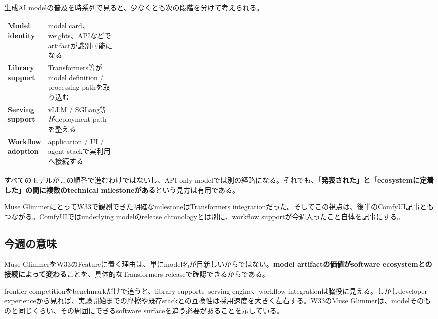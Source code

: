 生成AI modelの普及を時系列で見ると、少なくとも次の段階を分けて考えられる。

\begin{center}
\small
\begin{tabularx}{0.96\linewidth}{@{}>{\bfseries}p{0.26\linewidth}X@{}}
Model identity & model card、weights、APIなどでartifactが識別可能になる \\
Library support & Transformers等がmodel definition / processing pathを取り込む \\
Serving support & vLLM / SGLang等がdeployment pathを整える \\
Workflow adoption & application / UI / agent stackで実利用へ接続する \\
\end{tabularx}
\end{center}

すべてのモデルがこの順番で進むわけではないし、API-only modelでは別の経路になる。それでも、\textbf{「発表された」と「ecosystemに定着した」の間に複数のtechnical milestoneがある}という見方は有用である。

Muse GlimmerにとってW33で観測できた明確なmilestoneはTransformers integrationだった。そしてこの視点は、後半のComfyUI記事ともつながる。ComfyUIではunderlying modelのrelease chronologyとは別に、workflow supportが今週入ったこと自体を記事にする。

\subsection*{今週の意味}

Muse GlimmerをW33のFeatureに置く理由は、単にmodel名が目新しいからではない。\textbf{model artifactの価値がsoftware ecosystemとの接続によって変わる}ことを、具体的なTransformers releaseで確認できるからである。

frontier competitionをbenchmarkだけで追うと、library support、serving engine、workflow integrationは脇役に見える。しかしdeveloper experienceから見れば、実験開始までの摩擦や既存stackとの互換性は採用速度を大きく左右する。W33のMuse Glimmerは、modelそのものと同じくらい、その周囲にできるsoftware surfaceを追う必要があることを示している。
